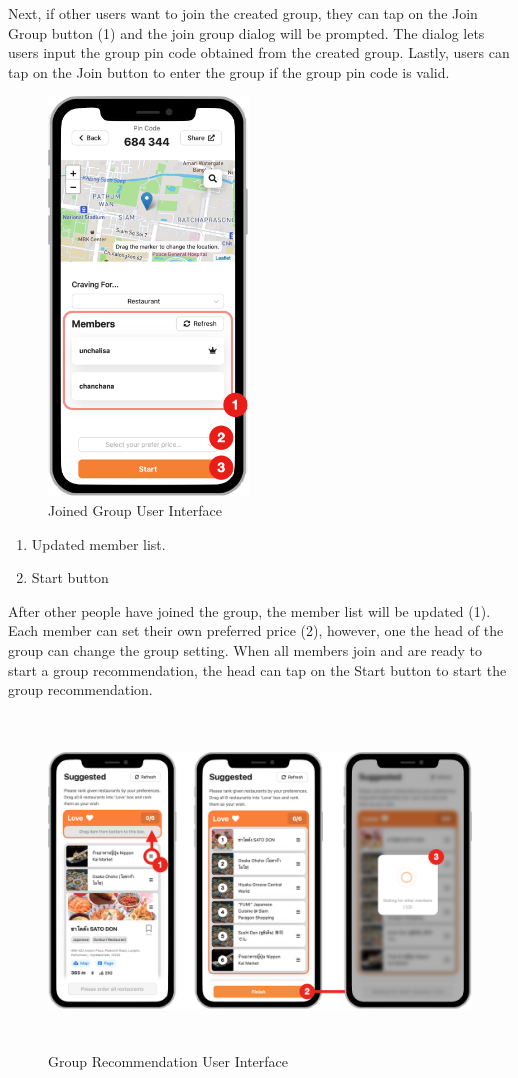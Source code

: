\documentclass[12pt,oneside,openright,a4paper]{cpe-english-project}
\begin{document}
Next, if other users want to join the created group, they can tap on the Join Group button (1) and the join group dialog will be prompted. The dialog lets users input the group pin code obtained from the created group. Lastly, users can tap on the Join button to enter the group if the group pin code is valid.
\begin{figure}[H]\centering
\includegraphics[height=300pt]{./images/4ui_JoinedGroupUserInterface.png}
\caption{Joined Group User Interface}\label{fig:4ui_JoinedGroupUserInterface}
\end{figure}

\begin{enumerate}
\item Updated member list.
\item Start button
\end{enumerate}

After other people have joined the group, the member list will be updated (1). Each member can set their own preferred price (2), however, one the head of the group can change the group setting. When all members join and  are ready to start a group recommendation, the head can tap on the Start button to start the group recommendation.
\begin{figure}[H]\centering
\includegraphics[height=250pt]{./images/4ui_GroupRecommendationUserInterface.png}
\caption{Group Recommendation User Interface}\label{fig:4ui_GroupRecommendationUserInterface}
\end{figure}
\end{document}
